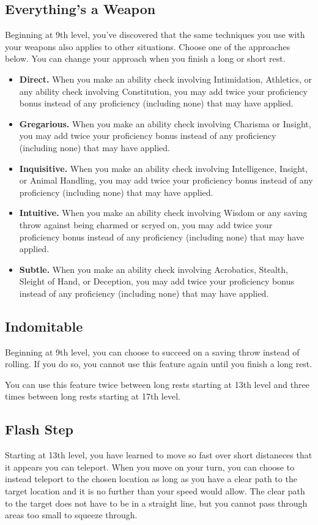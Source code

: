 \subsection{Everything's a Weapon}
Beginning at 9th level, you've discovered that the same techniques you use with your weapons also applies to other situations. Choose one of the approaches below. You can change your approach when you finish a long or short rest.

\begin{itemize}
	\item \textbf{Direct.} When you make an ability check involving Intimidation, Athletics, or any ability check involving Constitution, you may add twice your proficiency bonus instead of any proficiency (including none) that may have applied.
	\item \textbf{Gregarious.} When you make an ability check involving Charisma or Insight, you may add twice your proficiency bonus instead of any proficiency (including none) that may have applied.
	\item \textbf{Inquisitive.} When you make an ability check involving Intelligence, Insight, or Animal Handling, you may add twice your proficiency bonus instead of any proficiency (including none) that may have applied.
	\item \textbf{Intuitive.} When you make an ability check involving Wisdom or any saving throw against being charmed or scryed on, you may add twice your proficiency bonus instead of any proficiency (including none) that may have applied.
	\item \textbf{Subtle.} When you make an ability check involving Acrobatics, Stealth, Sleight of Hand, or Deception, you may add twice your proficiency bonus instead of any proficiency (including none) that may have applied.
\end{itemize}

\subsection{Indomitable}

Beginning at 9th level, you can choose to succeed on a saving throw instead of rolling. If you do so, you cannot use this feature again until you finish a long rest.

You can use this feature twice between long rests starting at 13th level and three times between long rests starting at 17th level.

\subsection{Flash Step}
Starting at 13th level, you have learned to move so fast over short distaneces that it appears you can teleport. When you move on your turn, you can choose to instead teleport to the chosen location as long as you have a clear path to the target location and it is no further than your speed would allow. The clear path to the target does not have to be in a straight line, but you cannot pass through areas too small to squeeze through.

